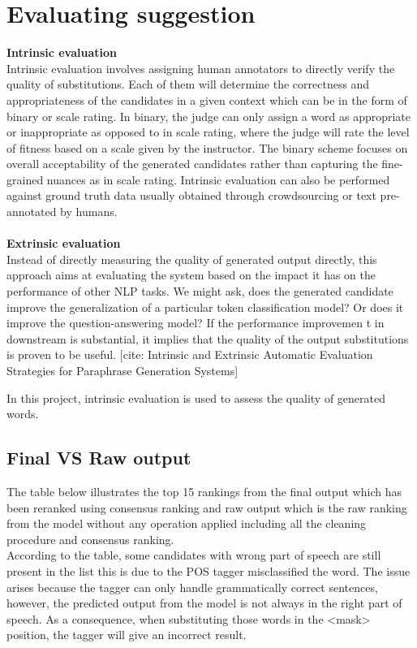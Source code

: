 \documentclass[12pt,oneside,openright,a4paper]{cpe-english-project}
\begin{document}
\section {Evaluating suggestion}

\textbf{Intrinsic evaluation}\\
Intrinsic evaluation involves assigning human annotators to directly verify the quality of substitutions.
Each of them will determine the correctness and appropriateness of the candidates in a given context which can be in the form of binary or scale rating. In binary, the judge can only assign a word as appropriate or inappropriate as opposed to in scale rating, where the judge will rate the level of fitness based on a scale given by the instructor.
The binary scheme focuses on overall acceptability of the generated candidates rather than capturing the fine-grained nuances as in scale rating. Intrinsic evaluation can also be performed against ground truth data usually obtained through crowdsourcing or text pre-annotated by humans.
\\\\
\textbf{Extrinsic evaluation}\\
Instead of directly measuring the quality of generated output directly, this approach aims at evaluating the system based on the impact it has on the performance of other NLP tasks. We might ask, does the generated candidate improve the generalization of a particular token classification model? Or does it improve the question-answering model? If the performance improvemen
t in downstream is substantial, it implies that the quality of the output substitutions is proven to be useful. [cite: Intrinsic and Extrinsic Automatic Evaluation Strategies for Paraphrase Generation Systems]

In this project, intrinsic evaluation is used to assess the quality of generated words.

\subsection{Final VS Raw output}
The table below illustrates the top 15 rankings from the final output which has been reranked using consensus ranking and raw output which is the raw ranking from the model without any operation applied including all the cleaning procedure and consensus ranking.
\\
According to the table, some candidates with wrong part of speech are still present in the list this is due to the POS tagger misclassified the word. The issue arises because the tagger can only handle grammatically correct sentences, however, the predicted output from the model is not always in the right part of speech. As a consequence, when substituting those words in the <mask> position, the tagger will give an incorrect result. 
\\\\
\end{document}
